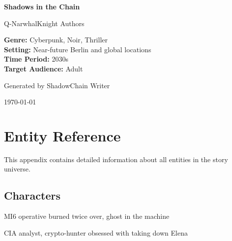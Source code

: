 \documentclass[12pt,oneside]{book}
\begin{document}
\begin{titlepage}
\centering
\vspace*{2cm}

{\Huge\bfseries\color{neongreen} Shadows in the Chain \par}
\vspace{1.5cm}

{\Large\color{neonblue} Q-NarwhalKnight Authors \par}
\vspace{2cm}

{\large\color{matrixgreen}  \par}
\vspace{1cm}

{\color{darkbg}
\begin{tcolorbox}[colback=darkbg,colframe=neonblue,arc=0pt,outer arc=0pt]
\color{neongreen}\textbf{Genre:} Cyberpunk, Noir, Thriller\\
\color{neongreen}\textbf{Setting:} Near-future Berlin and global locations\\
\color{neongreen}\textbf{Time Period:} 2030s\\
\color{neongreen}\textbf{Target Audience:} Adult
\end{tcolorbox}
}

\vfill
{\large\color{matrixgreen} Generated by ShadowChain Writer \par}
{\color{neonblue} \today \par}

\end{titlepage}

\newpage
\tableofcontents
\newpage


\appendix
\chapter{Entity Reference}

This appendix contains detailed information about all entities in the story universe.


\section{Characters}

\begin{description}[style=nextline]

\item[\textcolor{neongreen}{Elena Voss}] \textcolor{neonblue}{MI6 operative burned twice over, ghost in the machine}


\item[\textcolor{neongreen}{Marcus Hale}] \textcolor{neonblue}{CIA analyst, crypto-hunter obsessed with taking down Elena}

\end{description}
\end{document}
